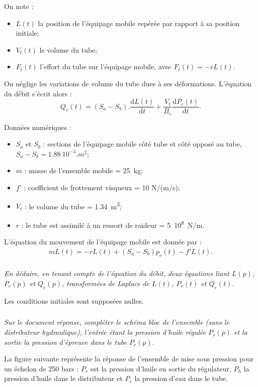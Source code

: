 \documentclass[10pt,fleqn]{article} %
\begin{document}
On note :
\begin{itemize}
	\item $L(t)$ la position de l’équipage mobile repérée par rapport à sa position initiale;
	\item $V_t(t)$ le volume du tube;
	\item $F_t(t)$ l’effort du tube sur l’équipage mobile, avec $F_t(t) = - rL(t)$.
\end{itemize}

On néglige les variations de volume du tube dues à ses déformations. L’équation du débit s’écrit alors :
	$$Q_e (t)=(S_a-S_b ).\dfrac{\text{d}L(t)}{\text{d}t}+\dfrac{V_t}{B_e}  \dfrac{\text{d}P_e (t)}{\text{d}t}.$$
	
	
Données numériques :
\begin{itemize}
	\item $S_a$ et $S_b$ :	sections de l’équipage mobile côté tube et côté opposé au tube,
$S_a -S_b  = \SI{1,88}{10^{-3}.m^2}$;	
	\item $m$ :		masse de l’ensemble mobile = \SI{25}{kg};
	\item $f ’$ :		coefficient de frottement visqueux = 10 N/(m/s);
	\item $V_t$ :		le volume du tube = \SI{1,34}{m^3};
	\item $r$ :		le tube est assimilé à un ressort de raideur = \SI{5}{10^8.N/m}.
\end{itemize}


L’équation du mouvement de l’équipage mobile est donnée par : 
$$
m\ddot{L}(t)=-rL(t)+\left(S_a-S_b \right)p_e(t)-f'\dot{L}(t).
$$

\subparagraph{}
\textit{En déduire, en tenant compte de l’équation du débit, deux équations liant $L(p)$, $P_e(p)$ et $Q_e(p)$, transformées de Laplace de $L(t)$, $P_e(t)$ et $Q_e(t)$. }

Les conditions initiales sont supposées nulles.

\subparagraph{}
\textit{Sur le document réponse, compléter le schéma bloc de l’ensemble (sans le distributeur hydraulique), l’entrée étant la pression d’huile régulée $P_r(p)$ et la sortie la pression d’épreuve dans le tube $P_e(p)$.}



La figure suivante représente la réponse de l’ensemble de mise sous pression pour un échelon de 250 bars : $P_r$ est la pression d’huile en sortie du régulateur, $P_h$ la pression d’huile dans le distributeur et $P_e$ la pression d’eau dans le tube.
\end{document}
